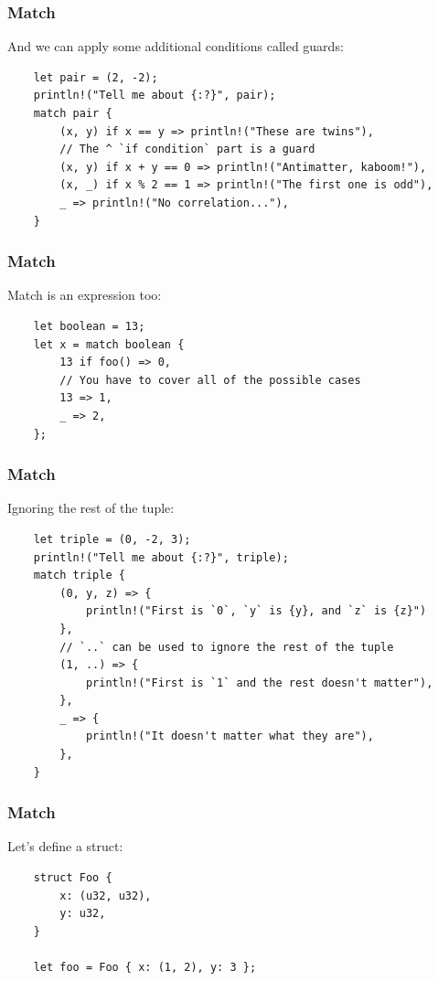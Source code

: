 \documentclass[aspectratio=1610,t]{beamer}
\begin{document}

\begin{frame}[fragile]
\frametitle{Match}
And we can apply some additional conditions called guards:

\begin{verbatim}
    let pair = (2, -2);
    println!("Tell me about {:?}", pair);
    match pair {
        (x, y) if x == y => println!("These are twins"),
        // The ^ `if condition` part is a guard
        (x, y) if x + y == 0 => println!("Antimatter, kaboom!"),
        (x, _) if x % 2 == 1 => println!("The first one is odd"),
        _ => println!("No correlation..."),
    }
\end{verbatim}
\end{frame}


\begin{frame}[fragile]
\frametitle{Match}
Match is an expression too:

\begin{verbatim}
    let boolean = 13;
    let x = match boolean {
        13 if foo() => 0,
        // You have to cover all of the possible cases
        13 => 1,
        _ => 2,
    };
\end{verbatim}
\end{frame}


\begin{frame}[fragile]
\frametitle{Match}
Ignoring the rest of the tuple:

\begin{verbatim}
    let triple = (0, -2, 3);
    println!("Tell me about {:?}", triple);
    match triple {
        (0, y, z) => {
            println!("First is `0`, `y` is {y}, and `z` is {z}")
        },
        // `..` can be used to ignore the rest of the tuple
        (1, ..) => {
            println!("First is `1` and the rest doesn't matter"),
        },
        _ => {
            println!("It doesn't matter what they are"),
        },
    }
\end{verbatim}
\end{frame}


\begin{frame}[fragile]
\frametitle{Match}
Let's define a struct:

\begin{verbatim}
    struct Foo {
        x: (u32, u32),
        y: u32,
    }

    let foo = Foo { x: (1, 2), y: 3 };
\end{verbatim}
\end{frame}
\end{document}
